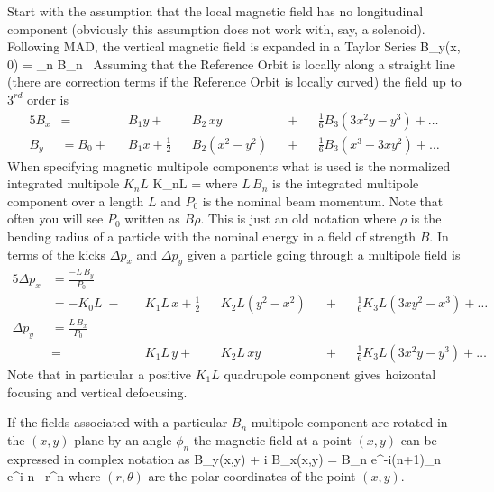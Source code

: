 Start with the assumption that the local magnetic field has no
longitudinal component (obviously this assumption does not work with,
say, a solenoid).  Following MAD, the vertical magnetic field is
expanded in a Taylor Series
\Begineq
  B_y(x, 0) = \sum_n B_n \, 
\Endeq
Assuming that the Reference Orbit is locally along a straight line
(there are correction terms if the Reference Orbit is locally curved) the 
field up to $3^{rd}$ order is
\begin{alignat}{5}
  B_x &=           &&B_1 y \plus         &&B_2 \, xy       && \plus && \frac{1}{6} B_3 (3x^2 y - y^3) \plus \ldots \\
  B_y &= B_0 \plus &&B_1 x + \frac{1}{2} &&B_2 (x^2 - y^2) && \plus && \frac{1}{6} B_3 (x^3 - 3x y^2) \plus \ldots
\end{alignat}
When specifying magnetic multipole components what is used is the
normalized integrated multipole $K_nL$
\Begineq
  K_nL = 
\Endeq
where $L \, B_n$ is the integrated multipole component over a length
$L$ and $P_0$ is the nominal beam momentum. Note that often you will see
$P_0$ written as $B\rho$. This is just an old notation where $\rho$
is the bending radius of a particle with the nominal energy in a field
of strength $B$. In terms of the kicks $\Delta p_x$ and $\Delta p_y$
given a particle going through a multipole field is
\begin{alignat}{5}
  \Delta p_x & = \frac{-L \, B_y}{P_0} \\
             & = -K_0 L \;-\; 
             && K_1 L \, x \plus 
             \frac{1}{2} && K_2 L (y^2 - x^2) && \plus 
             && \frac{1}{6} K_3 L (3x y^2 - x^3) \plus \ldots \nonumber \\
  \Delta p_y & = \frac{L \, B_x}{P_0} \\
             & =     
             && K_1 L \, y \plus 
             && K_2 L \, xy && \plus 
             && \frac{1}{6} K_3L (3x^2 y - y^3) \plus \ldots \nonumber 
\end{alignat}
Note that in particular a positive $K_1L$ quadrupole component gives
hoizontal focusing and vertical defocusing. 

If the fields associated with a particular $B_n$ multipole component
are rotated in the $(x, y)$ plane by an angle $\phi_n$ the magnetic
field at a point $(x,y)$ can be expressed in complex notation as
\Begineq
  B_y(x,y) + i B_x(x,y) = 
                 B_n e^{-i(n+1)\phi_n} \, e^{i n \theta} \, r^n 
\Endeq
where $(r, \theta)$ are the polar coordinates of the point $(x, y)$.

